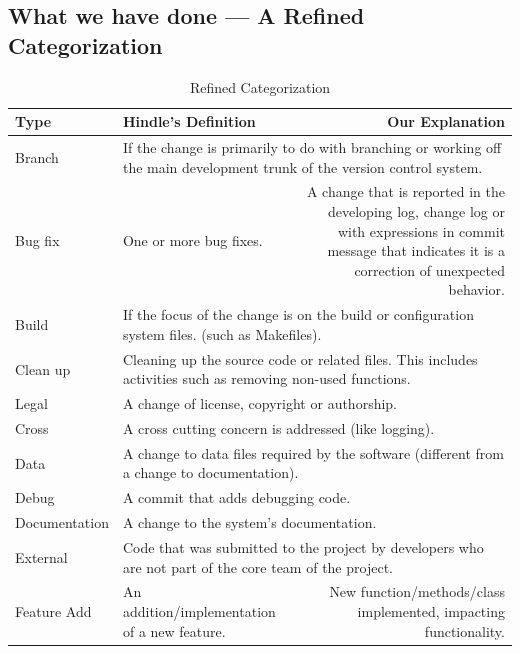 \subsection{What we have done --- A Refined Categorization}
\begin{table}[htbp]
  \centering
  \caption{Refined Categorization}
    \begin{tabular}{|p{6em}|p{9em}r|}
    \hline
    Type  & \multicolumn{1}{p{9em}|}{Hindle's Definition} & \multicolumn{1}{p{12.5em}|}{Our Explanation} \\
    \hline
    Branch & \multicolumn{2}{p{21.5em}|}{If the change is primarily to do with branching or working off the main development trunk of the version control system.} \\
    \hline
    Bug fix & \multicolumn{1}{p{9em}|}{One or more bug fixes.} & \multicolumn{1}{p{12.5em}|}{A change that is reported in the developing log, change log or with expressions in commit message that indicates it is a correction of unexpected behavior.} \\
    \hline
    Build & \multicolumn{2}{p{21.5em}|}{If the focus of the change is on the build or configuration system files. (such as Makefiles).} \\
    \hline
    Clean up & \multicolumn{2}{p{21.5em}|}{Cleaning up the source code or related files. This includes activities such as removing non-used functions.} \\
    \hline
    Legal & \multicolumn{2}{p{21.5em}|}{A change of license, copyright or authorship.} \\
    \hline
    Cross & \multicolumn{2}{p{21.5em}|}{A cross cutting concern is addressed (like logging).} \\
    \hline
    Data  & \multicolumn{2}{p{21.5em}|}{A change to data files required by the software (different from a change to documentation).} \\
    \hline
    Debug & \multicolumn{2}{p{21.5em}|}{A commit that adds debugging code.} \\
    \hline
    Documentation & \multicolumn{2}{p{21.5em}|}{A change to the system's documentation.} \\
    \hline
    External & \multicolumn{2}{p{21.5em}|}{Code that was submitted to the project by developers who are not part of the core team of the project.} \\
    \hline
    Feature Add & \multicolumn{1}{p{9em}|}{An addition/implementation of a new feature.} & \multicolumn{1}{p{12.5em}|}{New function/methods/class implemented, impacting functionality.} \\

\end{tabular}
\end{table}
